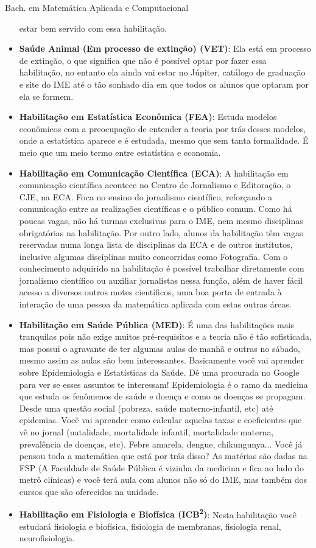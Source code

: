 \begin{subsecao}{Bach. em Matemática Aplicada e Computacional}
\begin{itemize}
    estar bem servido com essa habilitação.
  \item \textbf{Saúde Animal (Em processo de extinção) (VET)}: Ela está em
    processo de extinção, o que significa que não é possível optar por fazer
    essa habilitação, no entanto ela ainda vai estar no Júpiter, catálogo de
    graduação e site do IME até o tão sonhado dia em que todos os alunos que
    optaram por ela se formem.
  \item \textbf{Habilitação em Estatística Econômica (FEA)}: Estuda modelos
    econômicos com a preocupação de entender a teoria por trás desses modelos,
    onde a estatística aparece e é estudada, mesmo que sem tanta formalidade. É
    meio que um meio termo entre estatística e economia.
  \item \textbf{Habilitação em Comunicação Científica (ECA)}: A habilitação em
    comunicação científica acontece no Centro de Jornalismo e Editoração, o CJE,
    na ECA. Foca no ensino do jornalismo científico, reforçando a comunicação
    entre as realizações científicas e o público comum. Como há poucas vagas,
    não há turmas exclusivas para o IME, nem mesmo disciplinas obrigatórias na
    habilitação. Por outro lado, alunos da habilitação têm vagas reservadas numa
    longa lista de disciplinas da ECA e de outros institutos, inclusive algumas
    disciplinas muito concorridas como Fotografia. Com o conhecimento adquirido
    na habilitação é possível trabalhar diretamente com jornalismo científico ou
    auxiliar jornalistas nessa função, além de haver fácil acesso a diversos
    outros motes científicos, uma boa porta de entrada à interação de uma pessoa
    da matemática aplicada com estas outras áreas.
  \item \textbf{Habilitação em Saúde Pública (MED)}: É uma das habilitações mais
    tranquilas pois não exige muitos pré-requisitos e a teoria não é tão
    sofisticada, mas possui o agravante de ter algumas aulas de manhã e outras
    no sábado, mesmo assim as aulas são bem interessantes. Basicamente você vai
    aprender sobre Epidemiologia e Estatísticas da Saúde. Dê uma procurada no
    Google para ver se esses assuntos te interessam! Epidemiologia é o ramo da
    medicina que estuda os fenômenos de saúde e doença e como as doenças se
    propagam. Desde uma questão social (pobreza, saúde materno-infantil, etc)
    até epidemias. Você vai aprender como calcular aquelas taxas e coeficientes
    que vê no jornal (natalidade, mortalidade infantil, mortalidade materna,
    prevalência de doenças, etc). Febre amarela, dengue, chikungunya... Você já
    pensou toda a matemática que está por trás disso? As matérias são dadas na
    FSP (A Faculdade de Saúde Pública é vizinha da medicina e fica ao lado do
    metrô clínicas) e você terá aula com alunos não só do IME, mas também dos
    cursos que são oferecidos na unidade.
  \item \textbf{Habilitação em Fisiologia e Biofísica (ICB\textsuperscript{2})}:
    Nesta habilitação você estudará fisiologia e biofísica, fisiologia de
    membranas, fisiologia renal, neurofisiologia.
\end{itemize}


\end{subsecao}
